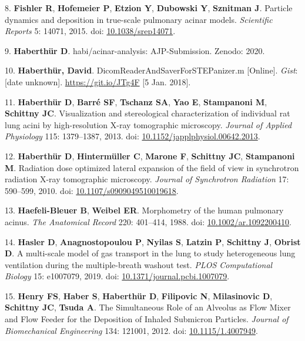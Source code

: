 \documentclass[
  american,
]{article}
\newenvironment{cslreferences}%
  {}%
  {\par}
\begin{document}
\begin{cslreferences}
\leavevmode\hypertarget{ref-CVl41LwO}{}%
8. \textbf{Fishler R}, \textbf{Hofemeier P}, \textbf{Etzion Y}, \textbf{Dubowski Y}, \textbf{Sznitman J}. Particle dynamics and deposition in true-scale pulmonary acinar models. \emph{Scientific Reports} 5: 14071, 2015. doi: \href{https://doi.org/10.1038/srep14071}{10.1038/srep14071}.

\leavevmode\hypertarget{ref-V87xbt0b}{}%
9. \textbf{Haberthür D}. habi/acinar-analysis: AJP-Submission. Zenodo: 2020.

\leavevmode\hypertarget{ref-12Z2YPzm8}{}%
10. \textbf{Haberthür, David}. DicomReaderAndSaverForSTEPanizer.m {[}Online{]}. \emph{Gist}: {[}date unknown{]}. \url{https://git.io/JTg4F} {[}5 Jan. 2018{]}.

\leavevmode\hypertarget{ref-7YLeeyu}{}%
11. \textbf{Haberthür D}, \textbf{Barré SF}, \textbf{Tschanz SA}, \textbf{Yao E}, \textbf{Stampanoni M}, \textbf{Schittny JC}. Visualization and stereological characterization of individual rat lung acini by high-resolution X-ray tomographic microscopy. \emph{Journal of Applied Physiology} 115: 1379--1387, 2013. doi: \href{https://doi.org/10.1152/japplphysiol.00642.2013}{10.1152/japplphysiol.00642.2013}.

\leavevmode\hypertarget{ref-VELl7OiR}{}%
12. \textbf{Haberthür D}, \textbf{Hintermüller C}, \textbf{Marone F}, \textbf{Schittny JC}, \textbf{Stampanoni M}. Radiation dose optimized lateral expansion of the field of view in synchrotron radiation X-ray tomographic microscopy. \emph{Journal of Synchrotron Radiation} 17: 590--599, 2010. doi: \href{https://doi.org/10.1107/s0909049510019618}{10.1107/s0909049510019618}.

\leavevmode\hypertarget{ref-BbEFwEVD}{}%
13. \textbf{Haefeli-Bleuer B}, \textbf{Weibel ER}. Morphometry of the human pulmonary acinus. \emph{The Anatomical Record} 220: 401--414, 1988. doi: \href{https://doi.org/10.1002/ar.1092200410}{10.1002/ar.1092200410}.

\leavevmode\hypertarget{ref-eb0gk6VO}{}%
14. \textbf{Hasler D}, \textbf{Anagnostopoulou P}, \textbf{Nyilas S}, \textbf{Latzin P}, \textbf{Schittny J}, \textbf{Obrist D}. A multi-scale model of gas transport in the lung to study heterogeneous lung ventilation during the multiple-breath washout test. \emph{PLOS Computational Biology} 15: e1007079, 2019. doi: \href{https://doi.org/10.1371/journal.pcbi.1007079}{10.1371/journal.pcbi.1007079}.

\leavevmode\hypertarget{ref-1HOyVjqpM}{}%
15. \textbf{Henry FS}, \textbf{Haber S}, \textbf{Haberthür D}, \textbf{Filipovic N}, \textbf{Milasinovic D}, \textbf{Schittny JC}, \textbf{Tsuda A}. The Simultaneous Role of an Alveolus as Flow Mixer and Flow Feeder for the Deposition of Inhaled Submicron Particles. \emph{Journal of Biomechanical Engineering} 134: 121001, 2012. doi: \href{https://doi.org/10.1115/1.4007949}{10.1115/1.4007949}.


\end{cslreferences}
\end{document}
